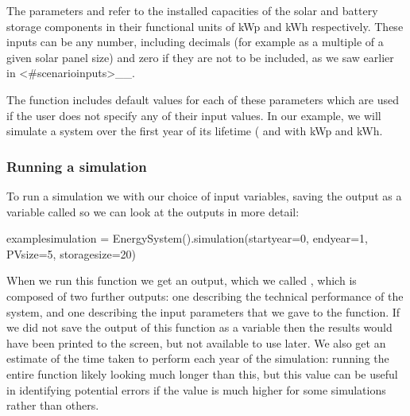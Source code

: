 \documentclass[letterpaper,10pt,english]{sphinxmanual}
\begin{document}
\sphinxAtStartPar
The parameters  and  refer to the installed
capacities of the solar and battery storage components in their
functional units of kWp and kWh respectively. These inputs can be any
number, including decimals (for example as a multiple of a given solar
panel size) and zero if they are not to be included, as we saw earlier
in \textasciigrave{} \textless{}\#scenario\sphinxhyphen{}inputs\textgreater{}\textasciigrave{}\_\_.

\sphinxAtStartPar
The  function includes default values
for each of these parameters which are used if the user does not specify
any of their input values. In our example, we will simulate a system
over the first year of its lifetime (
and with  kWp and  kWh.


\subsubsection{Running a simulation}
\label{\detokenize{energy_system_simulation:running-a-simulation}}
\sphinxAtStartPar
To run a simulation we 
with our choice of input variables, saving the output as a variable
called  so we can look at the outputs in more
detail:

\begin{sphinxVerbatim}[commandchars=\\\{\}]
example\PYGZus{}simulation = Energy\PYGZus{}System().simulation(start\PYGZus{}year=0, end\PYGZus{}year=1, PV\PYGZus{}size=5, storage\PYGZus{}size=20)
\end{sphinxVerbatim}

\begin{sphinxVerbatim}[commandchars=\\\{\}]
       
\end{sphinxVerbatim}

\sphinxAtStartPar
When we run this function we get an output, which we called
, which is composed of two further outputs: one
describing the technical performance of the system, and one describing
the input parameters that we gave to the function. If we did not save
the output of this function as a variable then the results would have
been printed to the screen, but not available to use later. We also get
an estimate of the time taken to perform each year of the simulation:
running the entire function likely looking much longer than this, but
this value can be useful in identifying potential errors if the value is
much higher for some simulations rather than others.
\end{document}

